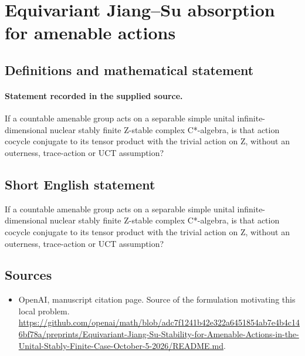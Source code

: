 \documentclass[11pt]{article}
\begin{document}
\section*{Equivariant Jiang–Su absorption for amenable actions}\label{30007298}
\subsection{Definitions and mathematical statement}
\paragraph{Statement recorded in the supplied source.}
If a countable amenable group acts on a separable simple unital infinite-dimensional nuclear stably finite Z-stable complex C*-algebra, is that action cocycle conjugate to its tensor product with the trivial action on Z, without an outerness, trace-action or UCT assumption?
\subsection{Short English statement}
If a countable amenable group acts on a separable simple unital infinite-dimensional nuclear stably finite Z-stable complex C*-algebra, is that action cocycle conjugate to its tensor product with the trivial action on Z, without an outerness, trace-action or UCT assumption?
\subsection{Sources}
\begin{itemize}
\item[S1] OpenAI, manuscript citation page. Source of the formulation motivating this local problem.
\url{https://github.com/openai/math/blob/adc7f1241b42e322a6451854ab7e4b4c146bf78a/preprints/Equivariant-Jiang-Su-Stability-for-Amenable-Actions-in-the-Unital-Stably-Finite-Case-October-5-2026/README.md}.
\end{itemize}
\end{document}
